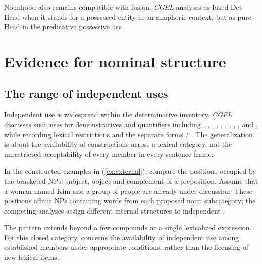 \documentclass[12pt]{article}
\begin{document}
Nounhood also remains compatible with fusion. \textit{CGEL} analyses  as fused Det--Head when it stands for a possessed entity in an anaphoric context, but as pure Head in the predicative possessive use  \citep[410--411]{huddleston2002}.

\section{Evidence for nominal structure}\label{sec:evidence}

\subsection{The range of independent uses}

Independent use is widespread within the determinative inventory. \textit{CGEL} discusses such uses for demonstratives and quantifiers including , , , , , , , , ,  and , while recording lexical restrictions and the separate forms / \citep[371--372, 410--424]{huddleston2002}. The generalization is about the availability of constructions across a lexical category, not the unrestricted acceptability of every member in every sentence frame.

In the constructed examples in (\ref{ex:external}), compare the positions occupied by the bracketed NPs: subject, object and complement of a preposition. Assume that a woman named Kim and a group of people are already under discussion. These positions admit NPs containing words from each proposed noun subcategory; the competing analyses assign different internal structures to independent .

\ea\label{ex:external}
\ea {}\qquad {}\qquad {}
\ex {}\qquad {}\qquad {}
\ex {}\qquad {}\qquad {}
\ex {}\qquad {}\qquad {}
\z\z

The pattern extends beyond a few compounds or a single lexicalized expression. For this closed category,  concerns the availability of independent use among established members under appropriate conditions, rather than the licensing of new lexical items.
\end{document}
